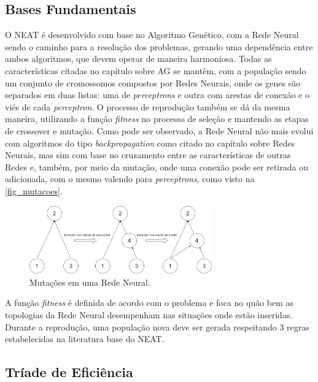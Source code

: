 \subsection{Bases Fundamentais}

O NEAT é desenvolvido com base no Algoritmo Genético, com a Rede Neural 
sendo o caminho para a resolução dos problemas, gerando uma dependência entre 
ambos algoritmos, que devem operar de maneira harmoniosa. Todas as 
características citadas no capítulo sobre AG se mantêm, com a população sendo 
um conjunto de cromossomos compostos por Redes Neurais, onde os genes são 
separados em duas listas: uma de \textit{perceptrons} e outra com arestas de conexão e o 
viés de cada \textit{perceptron}. O processo de reprodução também se dá da mesma 
maneira, utilizando a função \textit{fitness} no processo de seleção e mantendo as etapas 
de crossover e mutação. Como pode ser observado, a Rede Neural não mais evolui 
com algoritmos do tipo \textit{backpropagation} como citado no capítulo sobre Redes 
Neurais, mas sim com base no cruzamento entre as características de outras Redes 
e, também, por meio da mutação, onde uma conexão pode ser retirada 
ou adicionada, com o mesmo valendo para \textit{perceptrons}, como visto na \autoref{fig_mutacoes}.

\begin{figure}[htb]
        \centering
        \caption{\label{fig_mutacoes}Muta{\c c}{\~o}es em uma Rede Neural.}
        \includegraphics[width=0.7\textwidth]{images/MutaçãoDeTopologias.png}
\end{figure}

A função \textit{fitness} é definida de acordo com o problema e foca no quão bem as 
topologias da Rede Neural desempenham nas situações onde estão inseridas. 
Durante a reprodução, uma população nova deve ser gerada respeitando 3 regras 
estabelecidas na literatura base do NEAT.

\subsection{Tr{\'i}ade de Efici{\^e}ncia}


